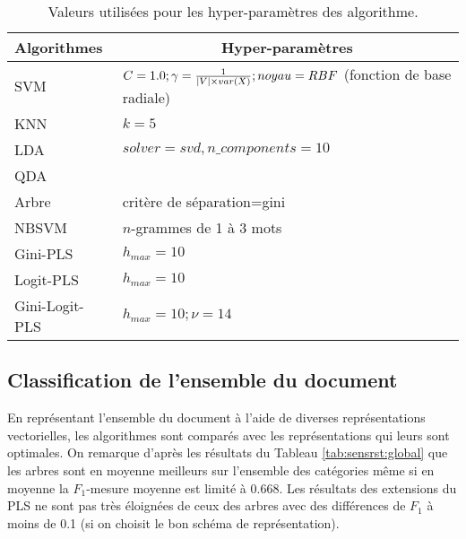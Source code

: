\begin{table}[htb]
	\scriptsize
	\centering
	\begin{tabular}{|l|p{}|}
		\hline
		Algorithmes & \multicolumn{1}{|c|}{Hyper-paramètres}\\ \hline
		SVM & $C=1.0; \gamma=\frac{1}{{\vert V\vert} \times var(X)}; noyau=RBF$ (fonction de base radiale)\\ \hline
		KNN & $k = 5$ \\ \hline
		LDA & $solver = svd, n\_components=10$ \\ \hline
		QDA & \\ \hline
		Arbre & critère de séparation=gini \\ \hline
		NBSVM & $n$-grammes de 1 à 3 mots  \\ \hline
		Gini-PLS & $h_{max} =10$ \\ \hline
		Logit-PLS & $h_{max} =10$ \\ \hline
		Gini-Logit-PLS & $h_{max} =10; \nu = 14$ \\ \hline
	\end{tabular}
	\caption{Valeurs utilisées pour les hyper-paramètres des algorithme.}\label{tab:sensrst:metapara}
\end{table}

%
\subsection{Classification de l'ensemble du document}

En représentant l'ensemble du document à l'aide de diverses représentations vectorielles, les algorithmes sont comparés avec les représentations qui leurs sont optimales. On remarque d'après les résultats du Tableau \ref{tab:sensrst:global} que les arbres sont en moyenne meilleurs sur l'ensemble des catégories même si en moyenne la $F_1$-mesure moyenne est limité à 0.668. Les résultats des extensions du PLS ne sont pas très éloignées de ceux des arbres avec des différences de $F_1$ à moins de 0.1 (si on choisit le bon schéma de représentation).

